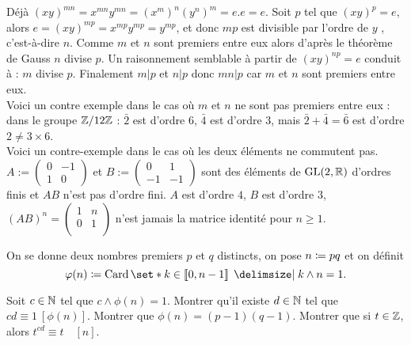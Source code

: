 \documentclass{magnolia}
\begin{document}
\begin{sol}
Déjà $(xy)^{mn} = x^{mn}y^{mn}= (x^m)^n(y^n)^m=e.e=e$. Soit $p$
tel que $(xy)^p = e$, alors $e= (xy)^{mp} = x^{mp}y^{mp}=y^{mp}$,
et donc $mp$ est divisible par l'ordre de $y$ , c'est-à-dire $n$.
Comme $m$ et $n$ sont premiers entre eux alors d'après le théorème
de Gauss $n$ divise $p$. Un raisonnement semblable à partir de
$(xy)^{np}=e$ conduit à : $m$ divise $p$. Finalement $m|p$ et
$n|p$ donc $mn|p$ car $m$ et $n$ sont premiers entre eux.\\
Voici un contre exemple dans le cas où $m$ et $n$ ne sont pas
premiers entre eux : dans le groupe $\mathbb{Z}/12\mathbb{Z}$ : $\bar{2}$ est
d'ordre $6$, $\bar{4}$ est d'ordre $3$, mais $\bar{2}+\bar{4} =
\bar{6}$ est d'ordre $2 \not= 3\times 6$.\\
Voici un contre-exemple dans le cas où les deux éléments ne commutent pas.
$A:=\left(\begin{smallmatrix} 0&-1\\1&0
\end{smallmatrix}\right)$ et $B:=\left(\begin{smallmatrix}
0&1\\-1&-1\end{smallmatrix}\right)$ sont des
\'el\'ements de $\text{GL}(2,\mathbb{R})$ d'ordres finis
et $AB$ n'est pas d'ordre fini. $A$ est d'ordre $4$, $B$ est d'ordre $3$, $(AB)^n =
\begin{pmatrix} 1&n\\0&1\\ \end{pmatrix}$ n'est jamais la matrice identité pour $n\geq 1$.
\end{sol}





On se donne deux nombres premiers $p$ et $q$ distincts, on pose
  $n\coloneqq pq$ et on définit
  \[\phi(n)\defeq\card\enstq{k\in\intere{0}{n-1}}{k\wedge n=1}.\]
  \begin{questions}
  \question Soit $c\in\mathbb{N}$ tel que $c\wedge \phi(n)=1$. Montrer qu'il existe $d\in\mathbb{N}$ tel que $cd\equiv 1\ [\phi(n)]$.
  \question Montrer que $\phi(n)=(p-1)(q-1)$.
  \question Montrer que si $t\in\mathbb{Z}$, alors $t^{cd}\equiv t \quad [n]$.
  \end{questions}
\end{document}
